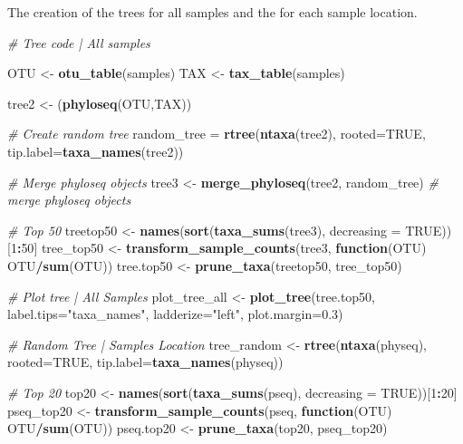 \documentclass[]{article}
\newenvironment{Shaded}{\begin{snugshade}}{\end{snugshade}}
\newcommand{\CommentTok}[1]{\textcolor[rgb]{0.56,0.35,0.01}{\textit{#1}}}
\newcommand{\ControlFlowTok}[1]{\textcolor[rgb]{0.13,0.29,0.53}{\textbf{#1}}}
\newcommand{\DataTypeTok}[1]{\textcolor[rgb]{0.13,0.29,0.53}{#1}}
\newcommand{\DecValTok}[1]{\textcolor[rgb]{0.00,0.00,0.81}{#1}}
\newcommand{\FloatTok}[1]{\textcolor[rgb]{0.00,0.00,0.81}{#1}}
\newcommand{\KeywordTok}[1]{\textcolor[rgb]{0.13,0.29,0.53}{\textbf{#1}}}
\newcommand{\NormalTok}[1]{#1}
\newcommand{\OperatorTok}[1]{\textcolor[rgb]{0.81,0.36,0.00}{\textbf{#1}}}
\newcommand{\OtherTok}[1]{\textcolor[rgb]{0.56,0.35,0.01}{#1}}
\newcommand{\StringTok}[1]{\textcolor[rgb]{0.31,0.60,0.02}{#1}}
\begin{document}
The creation of the trees for all samples and the for each sample
location.

\begin{Shaded}
\begin{Highlighting}[]
\CommentTok{# Tree code | All samples}

\NormalTok{OTU <-}\StringTok{ }\KeywordTok{otu_table}\NormalTok{(samples)           }
\NormalTok{TAX <-}\StringTok{ }\KeywordTok{tax_table}\NormalTok{(samples)}

\NormalTok{tree2 <-}\StringTok{ }\NormalTok{(}\KeywordTok{phyloseq}\NormalTok{(OTU,TAX))}

\CommentTok{# Create random tree}
\NormalTok{random_tree =}\StringTok{ }\KeywordTok{rtree}\NormalTok{(}\KeywordTok{ntaxa}\NormalTok{(tree2), }\DataTypeTok{rooted=}\OtherTok{TRUE}\NormalTok{, }\DataTypeTok{tip.label=}\KeywordTok{taxa_names}\NormalTok{(tree2))}

\CommentTok{# Merge phyloseq objects}
\NormalTok{tree3 <-}\StringTok{ }\KeywordTok{merge_phyloseq}\NormalTok{(tree2, random_tree) }\CommentTok{# merge phyloseq objects}

\CommentTok{# Top 50}
\NormalTok{treetop50 <-}\StringTok{ }\KeywordTok{names}\NormalTok{(}\KeywordTok{sort}\NormalTok{(}\KeywordTok{taxa_sums}\NormalTok{(tree3), }\DataTypeTok{decreasing =} \OtherTok{TRUE}\NormalTok{))[}\DecValTok{1}\OperatorTok{:}\DecValTok{50}\NormalTok{]}
\NormalTok{tree_top50 <-}\StringTok{ }\KeywordTok{transform_sample_counts}\NormalTok{(tree3, }\ControlFlowTok{function}\NormalTok{(OTU) OTU}\OperatorTok{/}\KeywordTok{sum}\NormalTok{(OTU))}
\NormalTok{tree.top50 <-}\StringTok{ }\KeywordTok{prune_taxa}\NormalTok{(treetop50, tree_top50)}

\CommentTok{# Plot tree | All Samples}
\NormalTok{plot_tree_all <-}\StringTok{ }\KeywordTok{plot_tree}\NormalTok{(tree.top50, }\DataTypeTok{label.tips=}\StringTok{"taxa_names"}\NormalTok{, }\DataTypeTok{ladderize=}\StringTok{"left"}\NormalTok{, }\DataTypeTok{plot.margin=}\FloatTok{0.3}\NormalTok{)}

\CommentTok{# Random Tree | Samples Location}
\NormalTok{tree_random <-}\StringTok{ }\KeywordTok{rtree}\NormalTok{(}\KeywordTok{ntaxa}\NormalTok{(physeq), }\DataTypeTok{rooted=}\OtherTok{TRUE}\NormalTok{, }\DataTypeTok{tip.label=}\KeywordTok{taxa_names}\NormalTok{(physeq))}

\CommentTok{# Top 20}
\NormalTok{top20 <-}\StringTok{ }\KeywordTok{names}\NormalTok{(}\KeywordTok{sort}\NormalTok{(}\KeywordTok{taxa_sums}\NormalTok{(pseq), }\DataTypeTok{decreasing =} \OtherTok{TRUE}\NormalTok{))[}\DecValTok{1}\OperatorTok{:}\DecValTok{20}\NormalTok{]}
\NormalTok{pseq_top20 <-}\StringTok{ }\KeywordTok{transform_sample_counts}\NormalTok{(pseq, }\ControlFlowTok{function}\NormalTok{(OTU) OTU}\OperatorTok{/}\KeywordTok{sum}\NormalTok{(OTU))}
\NormalTok{pseq.top20 <-}\StringTok{ }\KeywordTok{prune_taxa}\NormalTok{(top20, pseq_top20)}


\end{Highlighting}
\end{Shaded}
\end{document}
